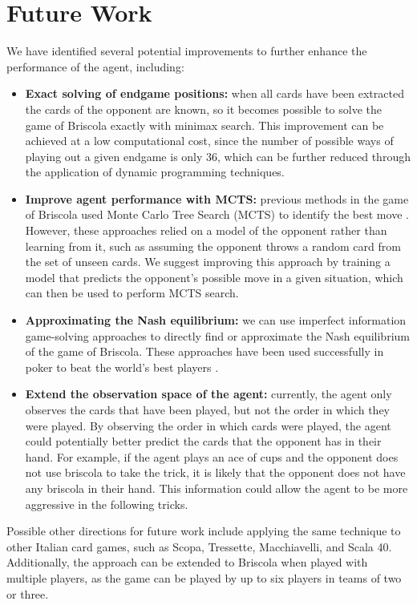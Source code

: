 \section{Future Work}
We have identified several potential improvements to further enhance the performance of the agent, including:
\begin{itemize}
    \item \textbf{Exact solving of endgame positions:} when all cards have been extracted the cards of the opponent are known, so it becomes possible to solve the game of Briscola exactly with minimax search. This improvement can be achieved at a low computational cost, since the number of possible ways of playing out a given endgame is only 36, which can be further reduced through the application of dynamic programming techniques.
    \item \textbf{Improve agent performance with MCTS:} previous methods in the game of Briscola used Monte Carlo Tree Search (MCTS) to identify the best move \cite{Briscola-mcts-Playing-Algorithm, villa2013-briscola-mcts}. However, these approaches relied on a model of the opponent rather than learning from it, such as assuming the opponent throws a random card from the set of unseen cards. We suggest improving this approach by training a model that predicts the opponent's possible move in a given situation, which can then be used to perform MCTS search.
    \item \textbf{Approximating the Nash equilibrium:} we can use imperfect information game-solving approaches to directly find or approximate the Nash equilibrium of the game of Briscola. These approaches have been used successfully in poker to beat the world's best players \cite{libratus}.
    \item \textbf{Extend the observation space of the agent:} currently, the agent only observes the cards that have been played, but not the order in which they were played. By observing the order in which cards were played, the agent could potentially better predict the cards that the opponent has in their hand. For example, if the agent plays an ace of cups and the opponent does not use briscola to take the trick, it is likely that the opponent does not have any briscola in their hand. This information could allow the agent to be more aggressive in the following tricks.
\end{itemize}
Possible other directions for future work include applying the same technique to other Italian card games, such as Scopa, Tressette, Macchiavelli, and Scala 40. Additionally, the approach can be extended to Briscola when played with multiple players, as the game can be played by up to six players in teams of two or three.
